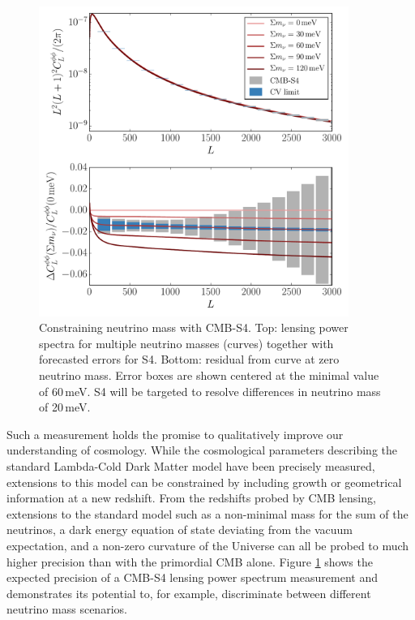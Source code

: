 \documentclass{tcibook}
\begin{document}
\begin{figure}[h]
\centering
\includegraphics[width=0.9\textwidth]{mnuS4errors.pdf}
\caption{Constraining neutrino mass with CMB-S4.  Top: lensing power spectra for multiple neutrino masses (curves) together with forecasted errors for S4.  Bottom: residual from curve at zero neutrino mass.  Error boxes are shown centered at the minimal value of $60$\,meV.  S4 will be targeted to resolve differences in neutrino mass of 20\,meV. }
\label{mnuS4errors}
\end{figure}

Such a measurement holds the promise to qualitatively improve our understanding of cosmology.  While the cosmological parameters describing the standard Lambda-Cold Dark Matter model have been precisely measured, extensions to this model can be constrained by including growth or geometrical information at a new redshift.  From the redshifts probed by CMB lensing, extensions to the standard model such as a non-minimal mass for the sum of the neutrinos, a dark energy equation of state deviating from the vacuum expectation, and a non-zero curvature of the Universe can all be probed to much higher precision than with the primordial CMB alone. Figure \ref{mnuS4errors} shows the expected precision of a CMB-S4 lensing power spectrum measurement and demonstrates its potential to, for example, discriminate between different neutrino mass scenarios. 
\end{document}
